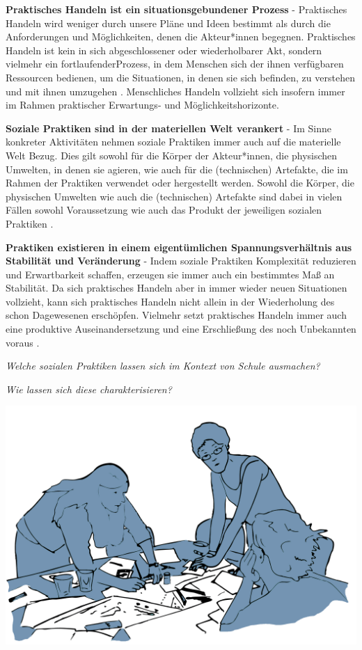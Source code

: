 \documentclass[
  a4paper,
]{book}
\begin{document}
\textbf{Praktisches Handeln ist ein situationsgebundener Prozess} - Praktisches Handeln wird weniger durch unsere Pläne und Ideen bestimmt als durch die Anforderungen und Möglichkeiten, denen die Akteur*innen begegnen. Praktisches Handeln ist kein in sich abgeschlossener oder wiederholbarer Akt, sondern vielmehr ein fortlaufenderProzess, in dem Menschen sich der ihnen verfügbaren Ressourcen bedienen, um die Situationen, in denen sie sich befinden, zu verstehen und mit ihnen umzugehen \citep[vgl. z.B.][]{horningSozialePraxisZwischen2004}. Menschliches Handeln vollzieht sich insofern immer im Rahmen praktischer Erwartungs- und Möglichkeitshorizonte.

\textbf{Soziale Praktiken sind in der materiellen Welt verankert} - Im Sinne konkreter Aktivitäten nehmen soziale Praktiken immer auch auf die materielle Welt Bezug. Dies gilt sowohl für die Körper der Akteur*innen, die physischen Umwelten, in denen sie agieren, wie auch für die (technischen) Artefakte, die im Rahmen der Praktiken verwendet oder hergestellt werden. Sowohl die Körper, die physischen Umwelten wie auch die (technischen) Artefakte sind dabei in vielen Fällen sowohl Voraussetzung wie auch das Produkt der jeweiligen sozialen Praktiken \citep[vgl. z.B.][]{schatzkiPrimerPracticesTheory2012}.

\textbf{Praktiken existieren in einem eigentümlichen Spannungsverhältnis aus Stabilität und Veränderung} - Indem soziale Praktiken Komplexität reduzieren und Erwartbarkeit schaffen, erzeugen sie immer auch ein bestimmtes Maß an Stabilität. Da sich praktisches Handeln aber in immer wieder neuen Situationen vollzieht, kann sich praktisches Handeln nicht allein in der Wiederholung des schon Dagewesenen erschöpfen. Vielmehr setzt praktisches Handeln immer auch eine produktive Auseinandersetzung und eine Erschließung des noch Unbekannten voraus \citep[vgl. z.B.][]{horningSozialePraxisZwischen2004}.

\begin{blackbox}
\emph{Welche sozialen Praktiken lassen sich im Kontext von Schule ausmachen?}

\emph{Wie lassen sich diese charakterisieren?}

\end{blackbox}

\begin{center}\includegraphics{Figures/03-02-praktik} \end{center}
\end{document}
